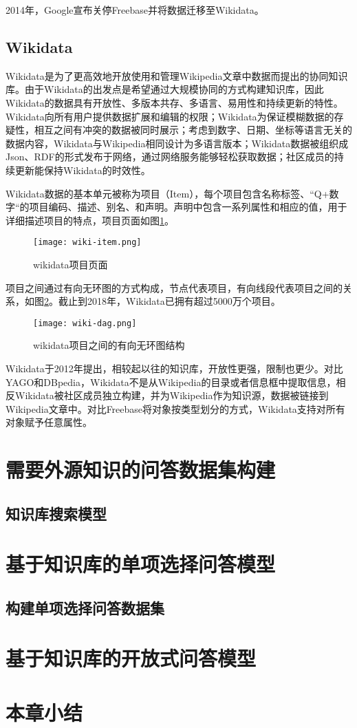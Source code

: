 2014年，Google宣布关停Freebase并将数据迁移至Wikidata。

\subsection{Wikidata}
Wikidata是为了更高效地开放使用和管理Wikipedia文章中数据而提出的协同知识库。由于Wikidata的出发点是希望通过大规模协同的方式构建知识库，因此Wikidata的数据具有开放性、多版本共存、多语言、易用性和持续更新的特性。Wikidata向所有用户提供数据扩展和编辑的权限；Wikidata为保证模糊数据的存疑性，相互之间有冲突的数据被同时展示；考虑到数字、日期、坐标等语言无关的数据内容，Wikidata与Wikipedia相同设计为多语言版本；Wikidata数据被组织成Json、RDF的形式发布于网络，通过网络服务能够轻松获取数据；社区成员的持续更新能保持Wikidata的时效性。

Wikidata数据的基本单元被称为项目（Item），每个项目包含名称标签、“Q+数字“的项目编码、描述、别名、和声明。声明中包含一系列属性和相应的值，用于详细描述项目的特点，项目页面如图\ref{wiki-item}。
\begin{figure}[H]
	\centering
	\texttt{[image: wiki-item.png]}
	\caption{wikidata项目页面}
	\label{wiki-item}
\end{figure}
项目之间通过有向无环图的方式构成，节点代表项目，有向线段代表项目之间的关系，如图\ref{wiki-dag}。截止到2018年，Wikidata已拥有超过5000万个项目。
\begin{figure}[H]
	\centering
	\texttt{[image: wiki-dag.png]}
	\caption{wikidata项目之间的有向无环图结构}
	\label{wiki-dag}
\end{figure}

Wikidata于2012年提出，相较起以往的知识库，开放性更强，限制也更少。对比YAGO和DBpedia，Wikidata不是从Wikipedia的目录或者信息框中提取信息，相反Wikidata被社区成员独立构建，并为Wikipedia作为知识源，数据被链接到Wikipedia文章中。对比Freebase将对象按类型划分的方式，Wikidata支持对所有对象赋予任意属性。

\section{需要外源知识的问答数据集构建}
\subsection{知识库搜索模型}

\section{基于知识库的单项选择问答模型}
\subsection{构建单项选择问答数据集}

\section{基于知识库的开放式问答模型}

\section{本章小结}
